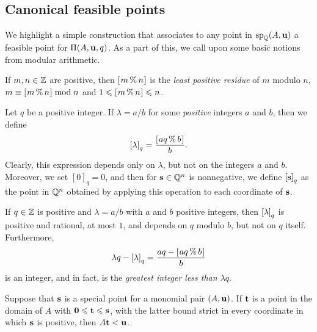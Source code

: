 \documentclass[11pt]{amsart}
\begin{document}
\subsection{Canonical feasible points}

We highlight a simple construction that associates to any point in $\operatorname{sp}_{\mathbb{Q}}(A, \mathbf{u})$ a feasible point for $\Pi(A, \mathbf{u}, q)$.
As a part of this, we call upon some basic notions from modular arithmetic.

\begin{definition} If $m,n \in \mathbb{Z}$ are positive, then $[ \hspace{.01in} m \, \% \, n \hspace{.01in} ]$ is the \emph{least positive residue} of $m$ modulo $n$, \ie $m \equiv [ \hspace{.01in} m \, \% \, n \hspace{.01in} ] \bmod n$ and $1 \leqslant [ \hspace{.01in} m \, \% \, n \hspace{.01in} ] \leqslant n$.
\end{definition}

\begin{definition}
   \label{tail: D}
   Let $q$ be a positive integer.
   If $\lambda = a/b$ for some \emph{positive} integers $a$ and $b$, then we define
   \[ \left[ \lambda \right]_q = \frac{ [ \hspace{.01in} aq \, \% \, b \hspace{.01in} ]}{b}. \]
   Clearly, this expression depends only on $\lambda$, but not on the integers $a$ and $b$.
   Moreover, we set $[0]_q = 0$, and then for $\mathbf{s} \in \mathbb{Q}^n$ is nonnegative, we define $\left[ \mathbf{s} \right]_q$ as the point in $\mathbb{Q}^n$ obtained by applying this operation to each coordinate of $\mathbf{s}$.
\end{definition}

\begin{remark}
\label{tail-basics: R}
If $q \in \mathbb{Z}$ is positive and $\lambda = a/b$ with $a$ and $b$ positive integers, then $\left[ \lambda \right]_q$ is positive and rational, at most $1$,  and depends on  $q$ modulo $b$, but not on $q$ itself.
Furthermore,
%
\[ \lambda q - \left[ \lambda \right]_q = \frac{aq-[ \hspace{.01in} aq \, \% \, b \hspace{.01in} ]}{b} \] is an integer, and in fact, is the \emph{greatest integer less than $\lambda q$}. 
\end{remark}


\begin{lemma}
   \label{less than u: L}  Suppose that $\mathbf{s}$ is a special point for a monomial pair $(A, \mathbf{u})$.
   If $\mathbf{t}$ is a point in the domain of $A$ with $\mathbf{0} \leqslant \mathbf{t} \leqslant \mathbf{s}$, with the latter bound strict in every coordinate in which $\mathbf{s}$ is positive, then $A \mathbf{t} < \mathbf{u}$.
\end{lemma}
\end{document}
